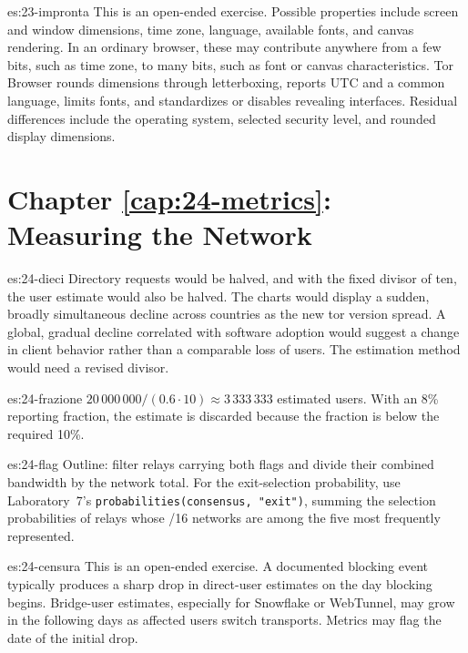 \begin{soluzione}{es:23-impronta}
This is an open-ended exercise. Possible properties include screen and window dimensions, time zone, language, available fonts, and canvas rendering. In an ordinary browser, these may contribute anywhere from a few bits, such as time zone, to many bits, such as font or canvas characteristics. Tor Browser rounds dimensions through letterboxing, reports UTC and a common language, limits fonts, and standardizes or disables revealing interfaces. Residual differences include the operating system, selected security level, and rounded display dimensions.
\end{soluzione}

\section*{Chapter \ref{cap:24-metrics}: Measuring the Network}

\begin{soluzione}{es:24-dieci}
Directory requests would be halved, and with the fixed divisor of ten, the user estimate would also be halved. The charts would display a sudden, broadly simultaneous decline across countries as the new tor version spread. A global, gradual decline correlated with software adoption would suggest a change in client behavior rather than a comparable loss of users. The estimation method would need a revised divisor.
\end{soluzione}

\begin{soluzione}{es:24-frazione}
$20\,000\,000 / (0.6 \cdot 10) \approx 3\,333\,333$ estimated users. With an 8\% reporting fraction, the estimate is discarded because the fraction is below the required 10\%.
\end{soluzione}

\begin{soluzione}{es:24-flag}
Outline: filter relays carrying both flags and divide their combined bandwidth by the network total. For the exit-selection probability, use Laboratory~7's \texttt{probabilities(consensus, "exit")}, summing the selection probabilities of relays whose /16 networks are among the five most frequently represented.
\end{soluzione}

\begin{soluzione}{es:24-censura}
This is an open-ended exercise. A documented blocking event typically produces a sharp drop in direct-user estimates on the day blocking begins. Bridge-user estimates, especially for Snowflake or WebTunnel, may grow in the following days as affected users switch transports. Metrics may flag the date of the initial drop.
\end{soluzione}


